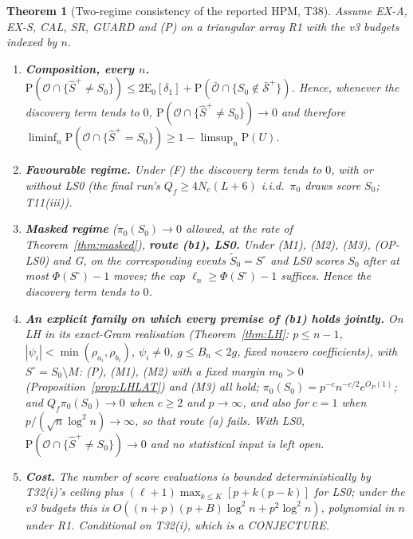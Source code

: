 \documentclass[11pt]{article}
\newtheorem{theorem}{Theorem}
\theoremstyle{definition}
\theoremstyle{remark}
\renewcommand{\Pr}{\mathrm{P}}
\newcommand{\E}{\mathrm{E}}
\newcommand{\Sz}{S_0}
\newcommand{\Spl}{\widehat S^{+}}
\newcommand{\cS}{\mathcal S}
\newcommand{\cO}{\mathcal O}
\begin{document}
\begin{theorem}[Two-regime consistency of the reported HPM, T38]\label{thm:T38}
Assume EX-A, EX-S, CAL, SR, GUARD and (P) on a triangular array R1 with the v3 budgets indexed by $n$.
\begin{enumerate}
\item[(0)] \textbf{Composition, every $n$.} $\Pr(\cO\cap\{\Spl\ne\Sz\})\le2\E_0[\delta_1]+\Pr(\bar{\cO}\cap\{\Sz\notin\bar{\cS}^+\})$.
Hence, whenever the discovery term tends to $0$, $\Pr(\cO\cap\{\Spl\ne\Sz\})\to0$ and therefore
$\liminf_n\Pr(\cO\cap\{\Spl=\Sz\})\ge1-\limsup_n\Pr(U)$.
\item[(a)] \textbf{Favourable regime.} Under (F) the discovery term tends to $0$, with or without LS0 (the final run's $Q_f\ge4N_e(L+6)$ i.i.d.\ $\pi_0$ draws score $\Sz$; T11(iii)).
\item[(b1)] \textbf{Masked regime} ($\pi_0(\Sz)\to0$ allowed, at the rate of Theorem~\ref{thm:masked}), \textbf{route (b1), LS0.} Under (M1), (M2), (M3), (OP-LS0) and G, on the corresponding events
$\tilde S_0=S^\circ$ and LS0 scores $\Sz$ after at most $\Phi(S^\circ)-1$ moves; the cap $\ell_n\ge\Phi(S^\circ)-1$ suffices. Hence the discovery term tends to $0$.
\item[(b1-LH)] \textbf{An explicit family on which every premise of (b1) holds jointly.} On LH in its exact-Gram realisation (Theorem~\ref{thm:LH}: $p\le n-1$, $|\psi_i|<\min(\rho_{a_i},\rho_{b_i})$, $\psi_i\ne0$, $g\le B_n<2g$, fixed nonzero coefficients), with $S^\circ=\Sz\setminus M$:
(P), (M1), (M2) with a fixed margin $m_0>0$ (Proposition~\ref{prop:LHLAT}) and (M3) all hold; $\pi_0(\Sz)=p^{-c}n^{-c/2}e^{O_P(1)}$; and $Q_f\pi_0(\Sz)\to0$ when $c\ge2$ and $p\to\infty$, and also for $c=1$ when $p/(\sqrt n\log^2n)\to\infty$, so that route (a) fails. With LS0, $\Pr(\cO\cap\{\Spl\ne\Sz\})\to0$ and no statistical input is left open.
\item[(c)] \textbf{Cost.} The number of score evaluations is bounded deterministically by T32(i)'s ceiling plus $(\ell+1)\max_{k\le K}[p+k(p-k)]$ for LS0; under the v3 budgets this is $O((n+p)(p+B)\log^2n+p^2\log^2n)$, polynomial in $n$ under R1. \emph{Conditional on T32(i), which is a CONJECTURE.}

\end{enumerate}
\end{theorem}
\end{document}

